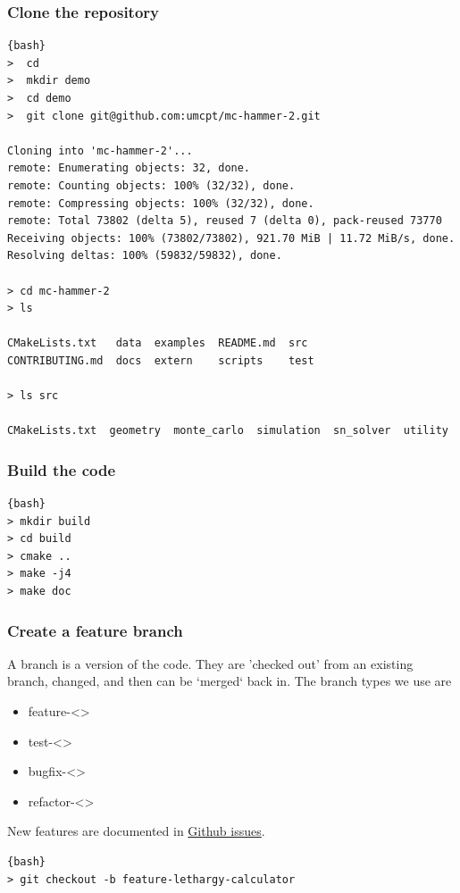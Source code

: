 \documentclass{beamer}
\begin{document}
\begin{frame}[fragile]
\frametitle{Clone the repository}

\scriptsize{
\begin{lstlisting}{bash}
>  cd 
>  mkdir demo
>  cd demo
>  git clone git@github.com:umcpt/mc-hammer-2.git

Cloning into 'mc-hammer-2'...
remote: Enumerating objects: 32, done.
remote: Counting objects: 100% (32/32), done.
remote: Compressing objects: 100% (32/32), done.
remote: Total 73802 (delta 5), reused 7 (delta 0), pack-reused 73770
Receiving objects: 100% (73802/73802), 921.70 MiB | 11.72 MiB/s, done.
Resolving deltas: 100% (59832/59832), done.

> cd mc-hammer-2
> ls

CMakeLists.txt   data  examples  README.md  src
CONTRIBUTING.md  docs  extern    scripts    test

> ls src

CMakeLists.txt  geometry  monte_carlo  simulation  sn_solver  utility
\end{lstlisting}}

\end{frame}

\begin{frame}[fragile]
\frametitle{Build the code}

\scriptsize{
\begin{lstlisting}{bash}
> mkdir build
> cd build
> cmake ..
> make -j4 
> make doc
\end{lstlisting}
}
\end{frame}

\begin{frame}[fragile]
\frametitle{Create a feature branch}
A branch is a version of the code. 
They are 'checked out' from an existing branch, changed, 
and then can be `merged` back in. 
The branch types we use are 
\begin{itemize}
  \item feature-<>
  \item test-<>
  \item bugfix-<>
  \item refactor-<>
\end{itemize}

New features are documented in 
\href{https://github.com/umcpt/mc-hammer-2/issues}{Github issues}.

\scriptsize{
\begin{lstlisting}{bash}
> git checkout -b feature-lethargy-calculator
\end{lstlisting}
}
\end{frame}
\end{document}
